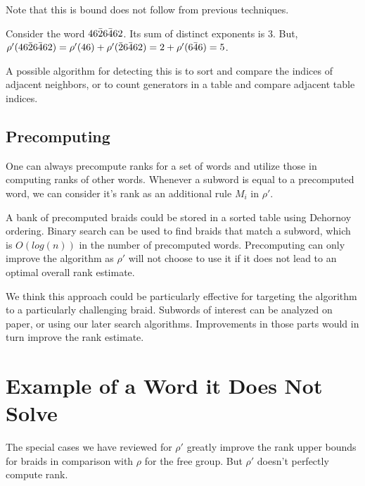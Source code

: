 \documentclass[12pt]{thesis}
\begin{document}
Note that this is bound does not follow from previous techniques.
\begin{example}
Consider the word $4 6 \bar{2} 6 \bar{4} 6 2$.
Its sum of distinct exponents is $3$.
But,
$\rho'(4 6 \bar{2} 6 \bar{4} 6 2) = \rho'(4 6) + \rho'(\bar{2} 6 \bar{4} 6 2) = 2 + \rho'(6 \bar{4} 6) = 5$.
\end{example}

A possible algorithm for detecting this
is to sort and compare the indices of adjacent neighbors,
or to count generators in a table and compare adjacent table indices.

\subsection{Precomputing}

One can always precompute ranks for a set of words
and utilize those in computing ranks of other words.
Whenever a subword is equal to a precomputed
word, 
we can consider it's rank as an additional rule $M_{i}$ in $\rho'$.

A bank of precomputed braids could be stored in a sorted table
using Dehornoy ordering.
Binary search can be used to find braids that match a subword, which is $O(log(n))$
in the number of precomputed words.
Precomputing can only improve the algorithm as $\rho'$ will
not choose to use it
if it does not lead to an optimal overall rank estimate.

We think this approach could be particularly effective for targeting
the algorithm to a particularly challenging braid.
Subwords of interest can be analyzed on paper, or using our later search algorithms.
Improvements in those parts would in turn improve the rank estimate.

\section{Example of a Word it Does Not Solve}

The special cases we have reviewed for $\rho'$ greatly improve the rank upper bounds
for braids in comparison with $\rho$ for the free group.
But $\rho'$ doesn't perfectly compute rank.
\end{document}
